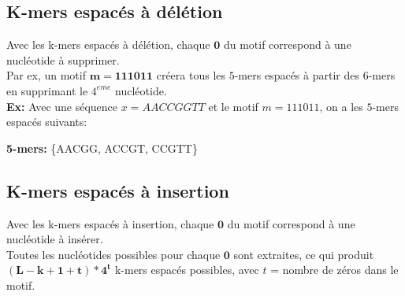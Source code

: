 \documentclass{report}
\begin{document}
      \subsection{K-mers espacés à délétion}
        Avec les k-mers espacés à délétion, chaque $\mathbf{0}$ du motif correspond à une nucléotide à supprimer.\\
        Par ex, un motif $\mathbf{m=111011}$ créera tous les $5$-mers espacés à partir des $6$-mers en supprimant le $4^{eme}$ nucléotide.\bigskip\\
        \textbf{Ex:} Avec une séquence $x = AACCGGTT$ et le motif $m = 111011$, on a les $5$-mers espacés suivants:\\
        \begin{center}\end{center}
        \textbf{5-mers:} \{AACGG, ACCGT, CCGTT\}
      \subsection{K-mers espacés à insertion}
        Avec les k-mers espacés à insertion, chaque $\mathbf{0}$ du motif correspond à une nucléotide à insérer.\\
        Toutes les nucléotides possibles pour chaque $\mathbf{0}$ sont extraites, ce qui produit $\mathbf{\left(L - k + 1 + t\right)*4^t}$ k-mers espacés possibles, avec $t$ = nombre de zéros dans le motif.\\
\end{document}
